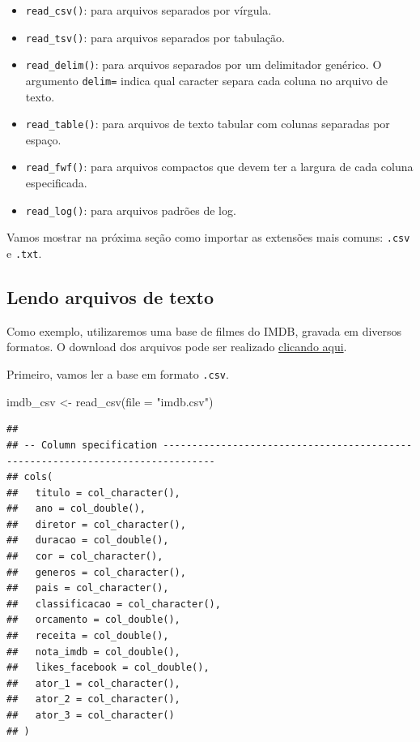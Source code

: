 \documentclass[
]{book}
\newenvironment{Shaded}{\begin{snugshade}}{\end{snugshade}}
\newcommand{\AttributeTok}[1]{\textcolor[rgb]{0.77,0.63,0.00}{#1}}
\newcommand{\FunctionTok}[1]{\textcolor[rgb]{0.00,0.00,0.00}{#1}}
\newcommand{\NormalTok}[1]{#1}
\newcommand{\OtherTok}[1]{\textcolor[rgb]{0.56,0.35,0.01}{#1}}
\newcommand{\StringTok}[1]{\textcolor[rgb]{0.31,0.60,0.02}{#1}}
\begin{document}
\begin{itemize}
\item
  \texttt{read\_csv()}: para arquivos separados por vírgula.
\item
  \texttt{read\_tsv()}: para arquivos separados por tabulação.
\item
  \texttt{read\_delim()}: para arquivos separados por um delimitador genérico. O argumento \texttt{delim=} indica qual caracter separa cada coluna no arquivo de texto.
\item
  \texttt{read\_table()}: para arquivos de texto tabular com colunas separadas por espaço.
\item
  \texttt{read\_fwf()}: para arquivos compactos que devem ter a largura de cada coluna especificada.
\item
  \texttt{read\_log()}: para arquivos padrões de log.
\end{itemize}

Vamos mostrar na próxima seção como importar as extensões mais comuns: \texttt{.csv} e \texttt{.txt}.

\hypertarget{lendo-arquivos-de-texto}{%
\subsection{Lendo arquivos de texto}\label{lendo-arquivos-de-texto}}

Como exemplo, utilizaremos uma base de filmes do IMDB, gravada em diversos formatos. O download dos arquivos pode ser realizado \href{https://github.com/curso-r/livro-material/raw/master/assets/data/imdb.zip}{clicando aqui}.

Primeiro, vamos ler a base em formato \texttt{.csv}.

\begin{Shaded}
\begin{Highlighting}[]
\NormalTok{imdb\_csv }\OtherTok{\textless{}{-}} \FunctionTok{read\_csv}\NormalTok{(}\AttributeTok{file =} \StringTok{"imdb.csv"}\NormalTok{)}
\end{Highlighting}
\end{Shaded}

\begin{verbatim}
## 
## -- Column specification -------------------------------------------------------------------------------
## cols(
##   titulo = col_character(),
##   ano = col_double(),
##   diretor = col_character(),
##   duracao = col_double(),
##   cor = col_character(),
##   generos = col_character(),
##   pais = col_character(),
##   classificacao = col_character(),
##   orcamento = col_double(),
##   receita = col_double(),
##   nota_imdb = col_double(),
##   likes_facebook = col_double(),
##   ator_1 = col_character(),
##   ator_2 = col_character(),
##   ator_3 = col_character()
## )
\end{verbatim}
\end{document}
